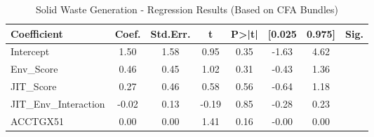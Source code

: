 \begin{table}[htbp]
    \centering
    \caption{Solid Waste Generation - Regression Results (Based on CFA Bundles)}
    \label{tab:regression}
    \begin{tabular}{lccccccc}
\toprule
Coefficient & Coef. & Std.Err. & t & P>|t| & [0.025 & 0.975] & Sig. \\
\midrule
Intercept & 1.50 & 1.58 & 0.95 & 0.35 & -1.63 & 4.62 &  \\
Env\_Score & 0.46 & 0.45 & 1.02 & 0.31 & -0.43 & 1.36 &  \\
JIT\_Score & 0.27 & 0.46 & 0.58 & 0.56 & -0.64 & 1.18 &  \\
JIT\_Env\_Interaction & -0.02 & 0.13 & -0.19 & 0.85 & -0.28 & 0.23 &  \\
ACCTGX51 & 0.00 & 0.00 & 1.41 & 0.16 & -0.00 & 0.00 &  \\
\bottomrule
\end{tabular}

    \end{table}
    